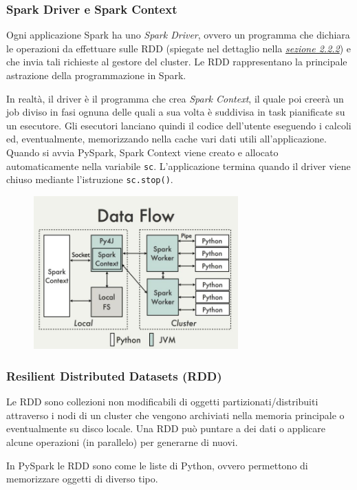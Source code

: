 \documentclass[titlepage]{article}
\begin{document}
\subsubsection{Spark Driver e Spark Context}
Ogni applicazione Spark ha uno \textit{Spark Driver}, ovvero un programma che dichiara le operazioni da effettuare sulle RDD (spiegate nel dettaglio nella \hyperref[sec:2.2.2]{\textit{sezione 2.2.2}}) e che invia tali richieste al gestore del cluster. Le RDD rappresentano la principale astrazione della programmazione in Spark.

In realtà, il driver è il programma che crea \textit{Spark Context}, il quale poi creerà un job diviso in fasi ognuna delle quali a sua volta è suddivisa in task pianificate su un esecutore. Gli esecutori lanciano quindi il codice dell'utente eseguendo i calcoli ed, eventualmente, memorizzando nella cache vari dati utili all'applicazione. Quando si avvia PySpark, Spark Context viene creato e allocato automaticamente nella variabile \texttt{sc}. L'applicazione termina quando il driver viene chiuso mediante l'istruzione \texttt{sc.stop()}.
\begin{figure}[htp]
	\centering
	\includegraphics[width=0.7\textwidth]{data-flow.png}
\end{figure}

\subsubsection{Resilient Distributed Datasets (RDD)}
\label{sec:2.2.2}
Le RDD sono collezioni non modificabili di oggetti partizionati/distribuiti attraverso i nodi di un cluster che vengono archiviati nella memoria principale o eventualmente su disco locale. Una RDD può puntare a dei dati o applicare alcune operazioni (in parallelo) per generarne di nuovi.

In PySpark le RDD sono come le liste di Python, ovvero permettono di memorizzare oggetti di diverso tipo.
\end{document}
